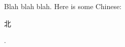 \documentclass{article}
\newcommand{\zh}[1]{\begin{CJK*}{UTF8}{cyberbit}#1\end{CJK*}}
\begin{document}
Blah blah blah.  Here is some Chinese: \zh{北}.
\end{document}
